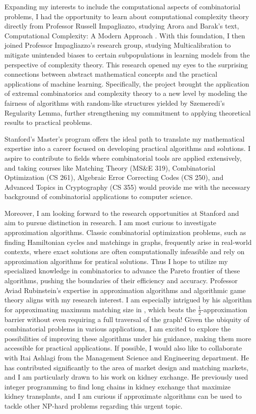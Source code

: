 \documentclass[12pt]{article}
\begin{document}
Expanding my interests to include the computational aspects of combinatorial problems, I had the
opportunity to learn about computational complexity theory directly from Professor Russell
Impagliazzo, studying Arora and Barak's text, Computational Complexity: A Modern Approach
\cite{arora2009computational}. With this foundation, I then joined Professor Impagliazzo's research
group, studying Multicalibration to mitigate unintended biases to certain subpopulations in learning
models from the perspective of complexity theory. This research opened my eyes to the surprising
connections between abstract mathematical concepts and the practical applications of machine
learning. Specifically, the project brought the application of extremal combinatorics and complexity
theory to a new level by modeling the fairness of algorithms with random-like structures yielded
by Szemeredi's Regularity Lemma, further strengthening my commitment to applying theoretical results
to practical problems.

Stanford's Master's program offers the ideal path to translate my mathematical expertise into a
career focused on developing practical algorithms and solutions. I aspire to contribute to fields
where combinatorial tools are applied extensively, and taking courses like Matching Theory (MS\&E
319), Combinatorial Optimization (CS 261), Algebraic Error Correcting Codes (CS 250), and Advanced
Topics in Cryptography (CS 355) would provide me with the necessary background of combinatorial
applications to computer science.

Moreover, I am looking forward to the research opportunities at Stanford and aim to pursue
distinction in research. I am most curious to investigate approximation algorithms. Classic
combinatorial optimization problems, such as finding Hamiltonian cycles and matchings in graphs,
frequently arise in real-world contexts, where exact solutions are often computationally infeasible
and rely on approximation algorithms for pratical solutions. Thus I hope to utilize my specialized
knowledge in combinatorics to advance the Pareto frontier of these algorithms, pushing the
boundaries of their efficiency and accuracy. Professor Aviad Rubinstein's expertise in approximation
algorithms and algorithmic game theory aligns with my research interest. I am especially intrigued
by his algorithm for approximating maximum matching size in
\cite{doi:10.1137/1.9781611977554.ch151}, which beats the $\frac{1}{2}$-approximation barrier
without even requiring a full traversal of the graph! Given the ubiquity of combinatorial problems
in various applications, I am excited to explore the possibilities of improving these algorithms
under his guidance, making them more accessible for practical applications. If possible, I would
also like to collaborate with Itai Ashlagi from the Management Science and Engineering department.
He has contributed significantly to the area of market design and matching markets, and I am
particularly drawn to his work on kidney exchange. He previously used integer programming to find
long chains in kidney exchange that maximize kidney transplants\cite{doi:10.1073/pnas.1421853112},
and I am curious if approximate algorithms can be used to tackle other NP-hard problems regarding
this urgent topic.
\end{document}
